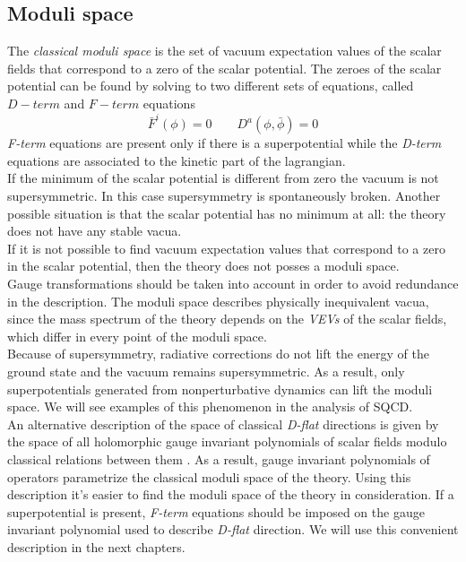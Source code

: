 \subsection{Moduli space}
\label{sec:subsection_moduli_space}
The \emph{classical moduli space} is the set of vacuum expectation values of the scalar fields that correspond to a zero of the scalar potential.
The zeroes of the scalar potential can be found by solving to two different sets of equations, called $D-term$ and $F-term $ equations
\begin{equation}
\bar{F}^i ( \phi) = 0 \qquad D^a (\phi , \bar{\phi}) = 0
\end{equation}
\emph{F-term} equations are present only if there is a superpotential while the \emph{D-term} equations are associated to the kinetic part of the lagrangian.\\
If the minimum of the scalar potential is different from zero the vacuum is not supersymmetric. 
In this case supersymmetry is spontaneously broken.
Another possible situation is that the scalar potential has no minimum at all: the theory does not have any stable vacua.\\
If it is not possible to find vacuum expectation values that correspond to a zero in the scalar potential, then the theory does not posses a moduli space.\\
Gauge transformations should be taken into account in order to avoid redundance in the description.
The moduli space describes physically inequivalent vacua, since the mass spectrum of the theory depends on the \emph{VEVs} of the scalar fields, which differ in every point of the moduli space. \\
Because of supersymmetry, radiative corrections do not lift the energy of the ground state and the vacuum remains supersymmetric.
As a result, only superpotentials generated from nonperturbative dynamics can lift the moduli space. 
We will see examples of this phenomenon in the analysis of SQCD.
\\
An alternative description of the space of classical \emph{D-flat} directions is given by the space of all holomorphic gauge invariant polynomials of scalar fields modulo classical relations between them \cite{Luty:1995sd}.
As a result, gauge invariant polynomials of operators parametrize the classical moduli space of the theory. 
Using this description it's easier to find the moduli space of the theory in consideration.
If a superpotential is present, \emph{F-term} equations should be imposed on the gauge invariant polynomial used to describe \emph{D-flat} direction.
We will use this convenient description in the next chapters.

